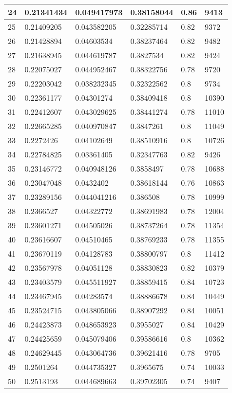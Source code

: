 \begin{longtable}{|l|l|l|l|l|l|}
24 & 0.21341434 & 0.049417973 & 0.38158044 & 0.86 & 9413 \\ \hline 
25 & 0.21409205 & 0.043582205 & 0.32285714 & 0.82 & 9372 \\ \hline 
26 & 0.21428894 & 0.04603534 & 0.38237464 & 0.82 & 9482 \\ \hline 
27 & 0.21638945 & 0.044619787 & 0.3827534 & 0.82 & 9424 \\ \hline 
28 & 0.22075027 & 0.044952467 & 0.38322756 & 0.78 & 9720 \\ \hline 
29 & 0.22203042 & 0.038232345 & 0.32322562 & 0.8 & 9734 \\ \hline 
30 & 0.22361177 & 0.04301274 & 0.38409418 & 0.8 & 10390 \\ \hline 
31 & 0.22412607 & 0.043029625 & 0.38441274 & 0.78 & 11010 \\ \hline 
32 & 0.22665285 & 0.040970847 & 0.3847261 & 0.8 & 11049 \\ \hline 
33 & 0.2272426 & 0.04102649 & 0.38510916 & 0.8 & 10726 \\ \hline 
34 & 0.22784825 & 0.03361405 & 0.32347763 & 0.82 & 9426 \\ \hline 
35 & 0.23146772 & 0.040948126 & 0.3858497 & 0.78 & 10688 \\ \hline 
36 & 0.23047048 & 0.0432402 & 0.38618144 & 0.76 & 10863 \\ \hline 
37 & 0.23289156 & 0.044041216 & 0.386508 & 0.78 & 10999 \\ \hline 
38 & 0.2366527 & 0.04322772 & 0.38691983 & 0.78 & 12004 \\ \hline 
39 & 0.23601271 & 0.04505026 & 0.38737264 & 0.78 & 11354 \\ \hline 
40 & 0.23616607 & 0.04510465 & 0.38769233 & 0.78 & 11355 \\ \hline 
41 & 0.23670119 & 0.04128783 & 0.38800797 & 0.8 & 11412 \\ \hline 
42 & 0.23567978 & 0.04051128 & 0.38830823 & 0.82 & 10379 \\ \hline 
43 & 0.23403579 & 0.045511927 & 0.38859415 & 0.84 & 10723 \\ \hline 
44 & 0.23467945 & 0.04283574 & 0.38886678 & 0.84 & 10449 \\ \hline 
45 & 0.23524715 & 0.043805066 & 0.38907292 & 0.84 & 10051 \\ \hline 
46 & 0.24423873 & 0.048653923 & 0.3955027 & 0.84 & 10429 \\ \hline 
47 & 0.24425659 & 0.045079406 & 0.39586616 & 0.8 & 10362 \\ \hline 
48 & 0.24629445 & 0.043064736 & 0.39621416 & 0.78 & 9705 \\ \hline 
49 & 0.2501264 & 0.044735327 & 0.3965675 & 0.74 & 10033 \\ \hline 
50 & 0.2513193 & 0.044689663 & 0.39702305 & 0.74 & 9407 \\ \hline 
\end{longtable}